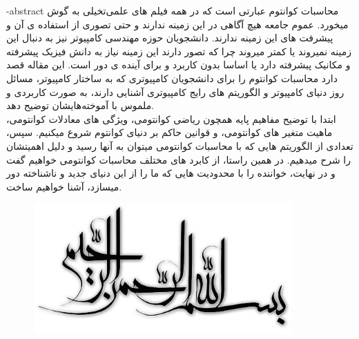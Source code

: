 

\fa-abstract {
محاسبات کوانتوم عبارتی است که در همه فیلم های علمی‌تخیلی به گوش میخورد. عموم جامعه هیچ آگاهی در این زمینه ندارند و حتی تصوری از استفاده ی آن و پیشرفت های این زمینه ندارند. دانشجویان حوزه مهندسی کامپیوتر نیز به دنبال این زمینه نمیروند یا کمتر میروند چرا که تصور دارند این زمینه نیاز به دانش فیزیک پیشرفته و مکانیک پیشرفته دارد یا اساسا بدون کاربرد و برای آینده ی دور است. این مقاله قصد دارد محاسبات کوانتوم را برای دانشجویان کامپیوتری که به ساختار کامپیوتر، مسائل روز دنیای کامپیوتر و الگوریتم های رایج کامپیوتری آشنایی دارند، به صورت کاربردی و ملموس با آموخته‌هایشان توضیح دهد.  
\\
ابتدا با توضیح مفاهیم پایه همچون ریاضی کوانتومی، ویژگی های معادلات کوانتومی، ماهیت متغیر های کوانتومی، و قوانین حاکم بر دنیای کوانتوم شروع میکنیم. سپس، تعدادی از الگوریتم هایی که با محاسبات کوانتومی میتوان به آنها رسید و دلیل اهمیتشان را شرح میدهیم. در همین راستا، از کابرد های مختلف محاسبات کوانتومی خواهیم گفت و در نهایت، خواننده را با محدودیت هایی که ما را از این دنیای جدید و ناشناخته دور میسازد، آشنا خواهیم ساخت.
}


\AUTtitle
\vspace*{7cm}
\thispagestyle{empty}
\begin{center}
\includegraphics[height=5cm,width=12cm]{besm}
\end{center}